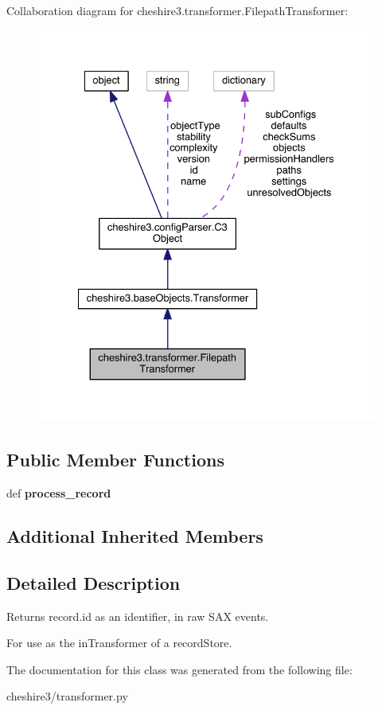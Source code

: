 Collaboration diagram for cheshire3.\-transformer.\-Filepath\-Transformer\-:
\nopagebreak
\begin{figure}[H]
\begin{center}
\leavevmode
\includegraphics[width=331pt]{classcheshire3_1_1transformer_1_1_filepath_transformer__coll__graph}
\end{center}
\end{figure}
\subsection*{Public Member Functions}
\begin{DoxyCompactItemize}
\item 
\hypertarget{classcheshire3_1_1transformer_1_1_filepath_transformer_aadb2014c3979ea2df5376698b4c343d0}{def {\bfseries process\-\_\-record}}\label{classcheshire3_1_1transformer_1_1_filepath_transformer_aadb2014c3979ea2df5376698b4c343d0}

\end{DoxyCompactItemize}
\subsection*{Additional Inherited Members}


\subsection{Detailed Description}
\begin{DoxyVerb}Returns record.id as an identifier, in raw SAX events.

For use as the inTransformer of a recordStore.
\end{DoxyVerb}
 

The documentation for this class was generated from the following file\-:\begin{DoxyCompactItemize}
\item 
cheshire3/transformer.\-py\end{DoxyCompactItemize}
